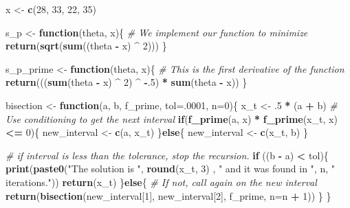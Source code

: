 \documentclass[]{article}
\newenvironment{Shaded}{\begin{snugshade}}{\end{snugshade}}
\newcommand{\KeywordTok}[1]{\textcolor[rgb]{0.13,0.29,0.53}{\textbf{#1}}}
\newcommand{\DataTypeTok}[1]{\textcolor[rgb]{0.13,0.29,0.53}{#1}}
\newcommand{\DecValTok}[1]{\textcolor[rgb]{0.00,0.00,0.81}{#1}}
\newcommand{\StringTok}[1]{\textcolor[rgb]{0.31,0.60,0.02}{#1}}
\newcommand{\CommentTok}[1]{\textcolor[rgb]{0.56,0.35,0.01}{\textit{#1}}}
\newcommand{\ControlFlowTok}[1]{\textcolor[rgb]{0.13,0.29,0.53}{\textbf{#1}}}
\newcommand{\OperatorTok}[1]{\textcolor[rgb]{0.81,0.36,0.00}{\textbf{#1}}}
\newcommand{\NormalTok}[1]{#1}
\begin{document}
\begin{Shaded}
\begin{Highlighting}[]
\NormalTok{x <-}\StringTok{ }\KeywordTok{c}\NormalTok{(}\DecValTok{28}\NormalTok{, }\DecValTok{33}\NormalTok{, }\DecValTok{22}\NormalTok{, }\DecValTok{35}\NormalTok{)}

\NormalTok{s_p <-}\StringTok{ }\ControlFlowTok{function}\NormalTok{(theta, x)\{}
  \CommentTok{# We implement our function to minimize}
  \KeywordTok{return}\NormalTok{(}\KeywordTok{sqrt}\NormalTok{(}\KeywordTok{sum}\NormalTok{((theta }\OperatorTok{-}\StringTok{ }\NormalTok{x) }\OperatorTok{^}\StringTok{ }\DecValTok{2}\NormalTok{)))}
\NormalTok{\}}

\NormalTok{s_p_prime <-}\StringTok{ }\ControlFlowTok{function}\NormalTok{(theta, x)\{}
  \CommentTok{# This is the first derivative of the function}
  \KeywordTok{return}\NormalTok{(((}\KeywordTok{sum}\NormalTok{(theta }\OperatorTok{-}\StringTok{ }\NormalTok{x) }\OperatorTok{^}\StringTok{ }\DecValTok{2}\NormalTok{) }\OperatorTok{^}\StringTok{ }\OperatorTok{-}\NormalTok{.}\DecValTok{5}\NormalTok{) }\OperatorTok{*}\StringTok{ }\KeywordTok{sum}\NormalTok{(theta }\OperatorTok{-}\StringTok{ }\NormalTok{x))}
\NormalTok{\}}

\NormalTok{bisection <-}\StringTok{ }\ControlFlowTok{function}\NormalTok{(a, b, f_prime, }\DataTypeTok{tol=}\NormalTok{.}\DecValTok{0001}\NormalTok{, }\DataTypeTok{n=}\DecValTok{0}\NormalTok{)\{}
\NormalTok{  x_t <-}\StringTok{ }\NormalTok{.}\DecValTok{5} \OperatorTok{*}\StringTok{ }\NormalTok{(a }\OperatorTok{+}\StringTok{ }\NormalTok{b)}
  \CommentTok{# Use conditioning to get the next interval}
  \ControlFlowTok{if}\NormalTok{(}\KeywordTok{f_prime}\NormalTok{(a, x) }\OperatorTok{*}\StringTok{ }\KeywordTok{f_prime}\NormalTok{(x_t, x) }\OperatorTok{<=}\StringTok{ }\DecValTok{0}\NormalTok{)\{}
\NormalTok{    new_interval <-}\StringTok{ }\KeywordTok{c}\NormalTok{(a, x_t)}
\NormalTok{  \}}\ControlFlowTok{else}\NormalTok{\{}
\NormalTok{    new_interval <-}\StringTok{ }\KeywordTok{c}\NormalTok{(x_t, b)}
\NormalTok{  \}}
  
  \CommentTok{# if interval is less than the tolerance, stop the recursion.}
  \ControlFlowTok{if}\NormalTok{ ((b }\OperatorTok{-}\StringTok{ }\NormalTok{a) }\OperatorTok{<}\StringTok{ }\NormalTok{tol)\{}
    \KeywordTok{print}\NormalTok{(}\KeywordTok{paste0}\NormalTok{(}\StringTok{"The solution is "}\NormalTok{, }\KeywordTok{round}\NormalTok{(x_t, }\DecValTok{3}\NormalTok{) , }\StringTok{" and it was found in "}\NormalTok{, n, }\StringTok{" iterations."}\NormalTok{))}
    \KeywordTok{return}\NormalTok{(x_t)}
\NormalTok{  \}}\ControlFlowTok{else}\NormalTok{\{}
    \CommentTok{# If not, call again on the new interval}
    \KeywordTok{return}\NormalTok{(}\KeywordTok{bisection}\NormalTok{(new_interval[}\DecValTok{1}\NormalTok{], new_interval[}\DecValTok{2}\NormalTok{], f_prime, }\DataTypeTok{n=}\NormalTok{n }\OperatorTok{+}\StringTok{ }\DecValTok{1}\NormalTok{))  }
\NormalTok{  \}}
\NormalTok{\}}


\end{Highlighting}
\end{Shaded}
\end{document}

